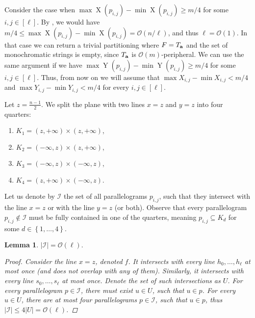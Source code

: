 \documentclass[11pt]{article}
\renewcommand{\O}{\mathcal{O}}
\newcommand{\set}[1]{\left\lbrace #1 \right\rbrace}
\theoremstyle{plain}
\newtheorem{lemma}{Lemma}
\theoremstyle{definition}
\theoremstyle{remark}
\DeclareMathOperator*{\X}{X}
\DeclareMathOperator*{\Y}{Y}
\begin{document}
Consider the case when $\max \X(p_{i, j}) - \min \X(p_{i, j}) \ge m / 4$ for some $i, j \in [\ell]$.
By , we would have $m / 4 \le \max \X(p_{i, j}) - \min \X(p_{i, j}) = \O(n / \ell)$, and thus $\ell = \O(1)$.
In that case we can return a trivial partitioning where $F = T_\mathbf{a}$ and the set of monochromatic strings is empty, since $T_\mathbf{a}$ is $\O(m)$-peripheral.
We can use the same argument if we have $\max \Y(p_{i, j}) - \min \Y(p_{i, j}) \ge m / 4$ for some $i, j \in [\ell]$.
Thus, from now on we will assume that $\max X_{i, j} - \min X_{i, j} < m / 4$ and $\max Y_{i, j} - \min Y_{i, j} < m / 4$ for every $i, j \in [\ell]$. 

Let $z = \frac{n - 1}{2}$. 
We split the plane with two lines $x = z$ and $y = z$ into four quarters:
\begin{enumerate}[1)]
	\item $K_1 = (z, +\infty) \times (z, +\infty)$,
	\item $K_2 = (-\infty, z) \times (z, +\infty)$,
	\item $K_3 = (-\infty, z) \times (-\infty, z)$,
	\item $K_4 = (z, +\infty) \times (-\infty, z)$.
\end{enumerate}
\newcommand{\I}{\mathcal{I}}
\newcommand{\G}{\mathcal{G}}
\newcommand{\C}{\mathcal{C}}
Let us denote by $\I$ the set of all parallelograms $p_{i, j}$, such that they intersect with the line $x = z$ or with the line $y = z$ (or both).
Observe that every parallelogram $p_{i, j} \not \in \I$ must be fully contained in one of the quarters, meaning $p_{i, j} \subseteq K_d$ for some $d \in \set{1, \dots, 4}$.

\begin{lemma}\label{I_size_bound}
	$|\I| = \O(\ell).$
	\begin{proof}
		Consider the line $x = z$, denoted $f$.
		It intersects with every line $h_0, \dots, h_\ell$ at most once (and does not overlap with any of them).
		Similarly, it intersects with every line $s_0, \dots, s_\ell$ at most once.
		Denote the set of such intersections as $U$.
		For every parallelogram $p \in \I$, there must exist $u \in U$, such that $u \in p$.
		For every $u \in U$, there are at most four parallelograms $p \in \I$, such that $u \in p$,
		thus $|\I| \le 4|U| = \O(\ell)$.
	\end{proof}
\end{lemma}
\end{document}
